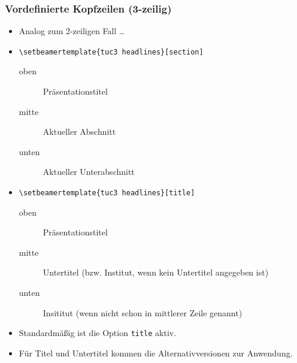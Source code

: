 \begin{frame}[containsverbatim]
\frametitle{Vordefinierte Kopfzeilen (3-zeilig)}

\begin{itemize}
\item Analog zum 2-zeiligen Fall \dots

\bigskip

\item \lstinline[language={[LaTeX]{TeX}}]+\setbeamertemplate{tuc3 headlines}[section]+
  \begin{description}
  \item[oben]  Präsentationstitel
  \item[mitte] Aktueller Abschnitt
  \item[unten] Aktueller Unterabschnitt
  \end{description}

\item \lstinline[language={[LaTeX]{TeX}}]+\setbeamertemplate{tuc3 headlines}[title]+
  \begin{description}
  \item[oben]  Präsentationstitel
  \item[mitte] Untertitel (bzw. Institut, wenn kein Untertitel angegeben ist)
  \item[unten] Insititut (wenn nicht schon in mittlerer Zeile genannt)
  \end{description}

\bigskip

\item Standardmäßig ist die Option \texttt{title} aktiv.
\item Für Titel und Untertitel kommen die Alternativversionen zur Anwendung.
\end{itemize}
\end{frame}

